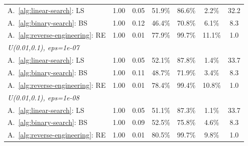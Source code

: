 \begin{table}[ht]
\begin{tabular}{lcccccc}
A.~\ref{alg:linear-search}: LS
& 1.00
& 0.05
& 51.9\%
& 86.6\%
& 2.2\%
& 32.2 \\
A.~\ref{alg:binary-search}: BS
& 1.00
& 0.12
& 46.4\%
& 70.8\%
& 6.1\%
& 8.3 \\
A.~\ref{alg:reverse-engineering}: RE
& 1.00
& 0.01
& 77.9\%
& 99.7\%
& 11.1\%
& 1.0 \\
\midrule
\multicolumn{7}{l}{\itshape U(0.01,0.1), eps=1e-07} \\
A.~\ref{alg:linear-search}: LS
& 1.00
& 0.05
& 52.1\%
& 87.8\%
& 1.4\%
& 33.7 \\
A.~\ref{alg:binary-search}: BS
& 1.00
& 0.11
& 48.7\%
& 71.9\%
& 3.4\%
& 8.3 \\
A.~\ref{alg:reverse-engineering}: RE
& 1.00
& 0.01
& 78.4\%
& 99.4\%
& 10.8\%
& 1.0 \\
\midrule
\multicolumn{7}{l}{\itshape U(0.01,0.1), eps=1e-08} \\
A.~\ref{alg:linear-search}: LS
& 1.00
& 0.05
& 51.1\%
& 87.3\%
& 1.1\%
& 33.7 \\
A.~\ref{alg:binary-search}: BS
& 1.00
& 0.09
& 52.5\%
& 75.8\%
& 4.6\%
& 8.3 \\
A.~\ref{alg:reverse-engineering}: RE
& 1.00
& 0.01
& 80.5\%
& 99.7\%
& 9.8\%
& 1.0 \\
\bottomrule
\end{tabular}
\end{table}

